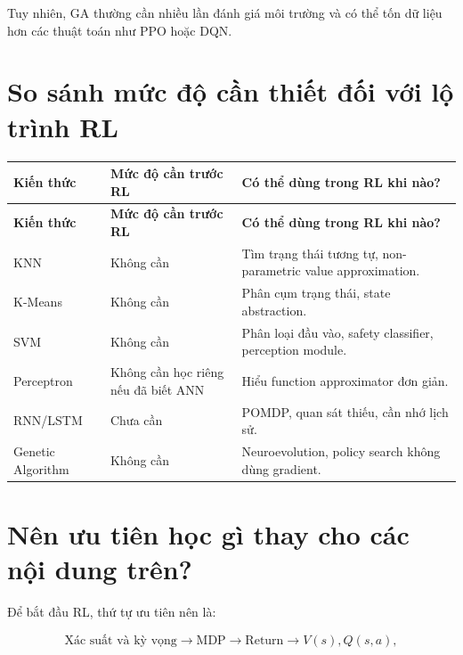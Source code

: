 \documentclass[12pt,a4paper]{report}
\begin{document}
Tuy nhiên, GA thường cần nhiều lần đánh giá môi trường và có thể tốn dữ liệu hơn các thuật toán như PPO hoặc DQN.

\section{So sánh mức độ cần thiết đối với lộ trình RL}

\begin{longtable}{
    >{\raggedright\arraybackslash}p{3.0cm}
    >{\raggedright\arraybackslash}p{4.0cm}
    >{\raggedright\arraybackslash}p{7.0cm}
}
\toprule
\textbf{Kiến thức} &
\textbf{Mức độ cần trước RL} &
\textbf{Có thể dùng trong RL khi nào?} \\
\midrule
\endfirsthead

\toprule
\textbf{Kiến thức} &
\textbf{Mức độ cần trước RL} &
\textbf{Có thể dùng trong RL khi nào?} \\
\midrule
\endhead

KNN &
Không cần &
Tìm trạng thái tương tự, non-parametric value approximation. \\

K-Means &
Không cần &
Phân cụm trạng thái, state abstraction. \\

SVM &
Không cần &
Phân loại đầu vào, safety classifier, perception module. \\

Perceptron &
Không cần học riêng nếu đã biết ANN &
Hiểu function approximator đơn giản. \\

RNN/LSTM &
Chưa cần &
POMDP, quan sát thiếu, cần nhớ lịch sử. \\

Genetic Algorithm &
Không cần &
Neuroevolution, policy search không dùng gradient. \\

\bottomrule
\end{longtable}

\section{Nên ưu tiên học gì thay cho các nội dung trên?}

Để bắt đầu RL, thứ tự ưu tiên nên là:

\begin{equation}
\text{Xác suất và kỳ vọng}
\rightarrow
\text{MDP}
\rightarrow
\text{Return}
\rightarrow
V(s),Q(s,a),
\end{equation}
\end{document}
